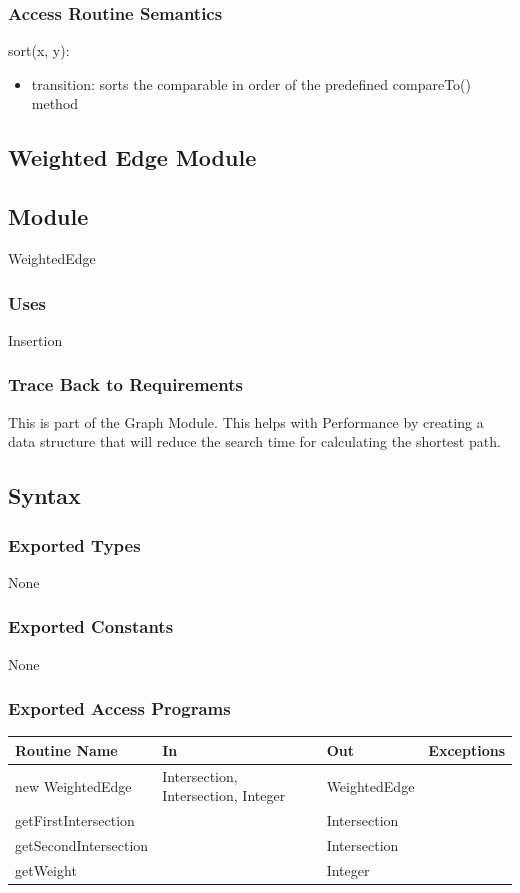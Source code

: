 \documentclass[12pt]{article}
\begin{document}
\subsubsection*{Access Routine Semantics}
\noindent sort(x, y):
\begin{itemize}
    \item transition: sorts the comparable in order of the predefined compareTo() method
\end{itemize}

\newpage
\subsection{Weighted Edge Module}
\subsection*{Module}
WeightedEdge

\subsubsection*{Uses}
Insertion

\subsubsection*{Trace Back to Requirements}
This is part of the Graph Module. This helps with Performance by creating a data structure that will reduce the search time for calculating the shortest path.

\subsection*{Syntax}
\subsubsection*{Exported Types}
None

\subsubsection*{Exported Constants}
None

\subsubsection*{Exported Access Programs}
    \begin{tabular}{|l|l|l|l|}
    \hline
    \textbf{Routine Name} & \textbf{In} & \textbf{Out} & \textbf{Exceptions}\\
    \hline
    new WeightedEdge & Intersection, Intersection, Integer & WeightedEdge & ~\\
    \hline
    getFirstIntersection & ~ & Intersection  & ~\\
    \hline
    getSecondIntersection & ~ & Intersection  & ~\\
    \hline
    getWeight & ~ & Integer  & ~\\
    \hline
    \end{tabular}
    
\end{document}
